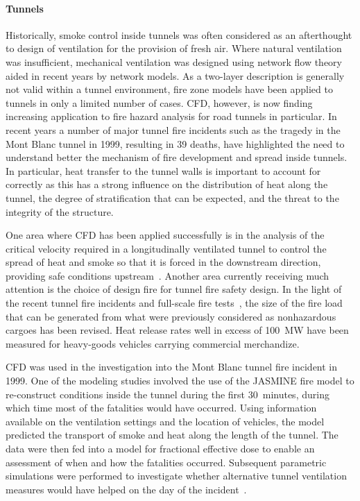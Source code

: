 \documentclass[graybox]{svmult}
\begin{document}
\paragraph{Tunnels}

Historically, smoke control inside tunnels was often considered as an afterthought to design of ventilation for the provision of fresh air. Where natural ventilation was insufficient, mechanical ventilation was designed using network flow theory aided in recent years by network models. As a two-layer description is generally not valid within a tunnel environment, fire zone models have been applied to tunnels in only a limited number of cases. CFD, however, is now finding increasing application to fire hazard analysis for road tunnels in particular. In recent years a number of major tunnel fire incidents such as the tragedy in the Mont Blanc tunnel in 1999, resulting in 39 deaths, have highlighted the need to understand better the mechanism of fire development and spread inside tunnels. In particular, heat transfer to the tunnel walls is important to account for correctly as this has a strong influence on the distribution of heat along the tunnel, the degree of stratification that can be expected, and the threat to the integrity of the structure.

One area where CFD has been applied successfully is in the analysis of the critical velocity required in a longitudinally ventilated tunnel to control the spread of heat and smoke so that it is forced in the downstream direction, providing safe conditions upstream~\cite{Hwang}. Another area currently receiving much attention is the choice of design fire for tunnel fire safety design. In the light of the recent tunnel fire incidents and full-scale fire tests~\cite{Ingason}, the size of the fire load that can be generated from what were previously considered as nonhazardous cargoes has been revised. Heat release rates well in excess of 100~MW have been measured for heavy-goods vehicles carrying commercial merchandize.

CFD was used in the investigation into the Mont Blanc tunnel fire incident in 1999. One of the modeling studies involved the use of the JASMINE fire model to re-construct conditions inside the tunnel during the first 30~minutes, during which time most of the fatalities would have occurred. Using information available on the ventilation settings and the location of vehicles, the model predicted the transport of smoke and heat along the length of the tunnel. The data were then fed into a model for fractional effective dose to enable an assessment of when and how the fatalities occurred. Subsequent parametric simulations were performed to investigate whether alternative tunnel ventilation measures would have helped on the day of the incident~\cite{Miles:2004}.
\end{document}
